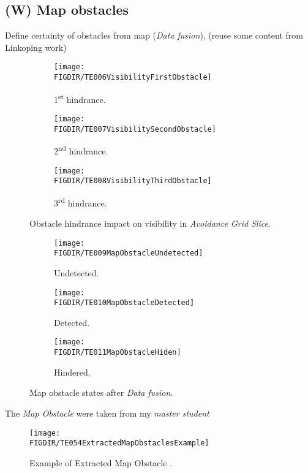 \subsection{(W) Map obstacles}\label{s:mapObstacles}
    \noindent Define certainty of obstacles from map (\emph{Data fusion}), (reuse some content from Linkoping work)
    \begin{figure}[H]
        \begin{subfigure}{0.32\textwidth}
            \texttt{[image: \\FIGDIR/TE006VisibilityFirstObstacle]} 
            \caption{1\textsuperscript{st} hindrance.}
            \label{fig:fistObstacleHindrance}
        \end{subfigure}
        \begin{subfigure}{0.32\textwidth}
            \texttt{[image: \\FIGDIR/TE007VisibilitySecondObstacle]} 
            \caption{2\textsuperscript{nd} hindrance.}
            \label{fig:secondObstacleHindrance}
        \end{subfigure}
        \begin{subfigure}{0.32\textwidth}
            \texttt{[image: \\FIGDIR/TE008VisibilityThirdObstacle]} 
            \caption{3\textsuperscript{rd} hindrance.}
            \label{fig:thirdObstacleHindrance}
        \end{subfigure}
        \caption{Obstacle hindrance impact on visibility in \emph{Avoidance Grid Slice}.}
        \label{fig:hindranceImpactOnVisibility}
    \end{figure}
    
    
    \begin{figure}[H]
        \begin{subfigure}{0.32\textwidth}
            \texttt{[image: \\FIGDIR/TE009MapObstacleUndetected]} 
            \caption{Undetected.}
            \label{fig:undetectedMapObstalce.}
        \end{subfigure}
        \begin{subfigure}{0.32\textwidth}
            \texttt{[image: \\FIGDIR/TE010MapObstacleDetected]} 
            \caption{Detected.}
            \label{fig:detectedMapObstacle}
        \end{subfigure}
        \begin{subfigure}{0.32\textwidth}
            \texttt{[image: \\FIGDIR/TE011MapObstacleHiden]}
            \caption{Hindered.}
            \label{fig:hinderedMapObstacle}
        \end{subfigure}
        \caption{Map obstacle states after \emph{Data fusion}.}
        \label{fig:mapObstacleStatesAfterDataFusion}
    \end{figure}


The \emph{Map Obstacle} were taken from my \emph{master student} \cite{cernamaria2018}
    
\begin{figure}[H]
    \centering
    \texttt{[image: \\FIGDIR/TE054ExtractedMapObstaclesExample]}
    \caption{Example of Extracted Map Obstacle \cite{cernamaria2018}.}
    \label{fig:exampleExtractedMapObstacles}
\end{figure} 
